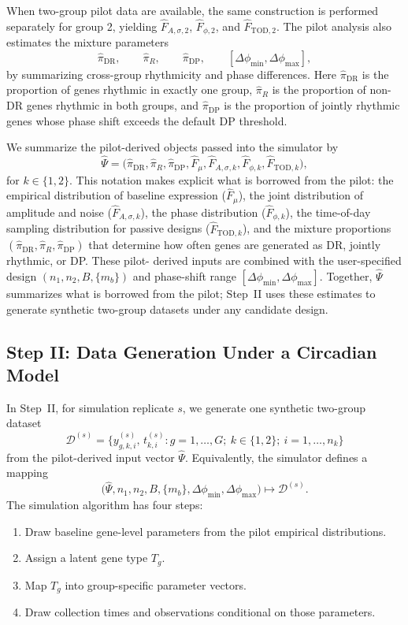 \documentclass{article}
\begin{document}
When two-group pilot data are available, the same construction is performed
separately for group 2, yielding $\hat{F}_{A,\sigma,2}$, $\hat{F}_{\phi,2}$,
and $\hat{F}_{\mathrm{TOD},2}$. The pilot analysis also estimates the mixture
parameters
\[
\hat{\pi}_{\mathrm{DR}},\qquad \hat{\pi}_R,\qquad
\hat{\pi}_{\mathrm{DP}},\qquad
[\Delta\phi_{\min},\Delta\phi_{\max}],
\]
by summarizing cross-group rhythmicity and phase differences. Here
$\hat{\pi}_{\mathrm{DR}}$ is the proportion of genes rhythmic in exactly one
group, $\hat{\pi}_R$ is the proportion of non-DR genes rhythmic in both groups,
and $\hat{\pi}_{\mathrm{DP}}$ is the proportion of jointly rhythmic genes whose
phase shift exceeds the default DP threshold.

We summarize the pilot-derived objects passed into the simulator by
\[
\hat{\Psi}
=
\bigl(
\hat{\pi}_{\mathrm{DR}},\hat{\pi}_R,\hat{\pi}_{\mathrm{DP}},
\hat{F}_{\mu},\hat{F}_{A,\sigma,k},\hat{F}_{\phi,k},\hat{F}_{\mathrm{TOD},k}
\bigr),
\]
for $k\in\{1,2\}$. This notation makes explicit what is borrowed from the pilot:
the empirical distribution of baseline expression ($\hat{F}_\mu$), the joint
distribution of amplitude and noise ($\hat{F}_{A,\sigma,k}$), the phase
distribution ($\hat{F}_{\phi,k}$), the time-of-day sampling distribution for
passive designs ($\hat{F}_{\mathrm{TOD},k}$), and the mixture proportions
$(\hat{\pi}_{\mathrm{DR}},\hat{\pi}_R,\hat{\pi}_{\mathrm{DP}})$ that determine
how often genes are generated as DR, jointly rhythmic, or DP. These pilot-
derived inputs are combined with the user-specified design
$(n_1,n_2,B,\{m_b\})$ and phase-shift range
$[\Delta\phi_{\min},\Delta\phi_{\max}]$.
Together, $\hat{\Psi}$ summarizes what is borrowed from the pilot; Step~II
uses these estimates to generate synthetic two-group datasets under any
candidate design.

\subsection{Step II: Data Generation Under a Circadian Model}
\label{sec:generative}

In Step~II, for simulation replicate $s$, we generate one synthetic two-group
dataset
\[
\mathcal{D}^{(s)}=\bigl\{y_{g,k,i}^{(s)},\,t_{k,i}^{(s)}:
g=1,\ldots,G;\ k\in\{1,2\};\ i=1,\ldots,n_k\bigr\}
\]
from the pilot-derived input vector $\hat{\Psi}$. Equivalently, the simulator
defines a mapping
\[
\bigl(\hat{\Psi},n_1,n_2,B,\{m_b\},\Delta\phi_{\min},\Delta\phi_{\max}\bigr)
\longmapsto \mathcal{D}^{(s)}.
\]
The simulation algorithm has four steps:
\begin{enumerate}
\item Draw baseline gene-level parameters from the pilot empirical
distributions.
\item Assign a latent gene type $T_g$.
\item Map $T_g$ into group-specific parameter vectors.
\item Draw collection times and observations conditional on those parameters.
\end{enumerate}
\end{document}
